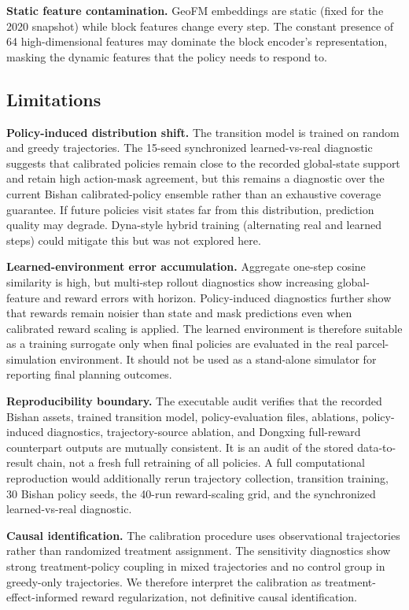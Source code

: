 \documentclass[11pt]{article}
\begin{document}
\textbf{Static feature contamination.} GeoFM embeddings are static (fixed for the 2020 snapshot) while block features change every step. The constant presence of 64 high-dimensional features may dominate the block encoder's representation, masking the dynamic features that the policy needs to respond to.

\subsection{Limitations}

\textbf{Policy-induced distribution shift.} The transition model is trained on random and greedy trajectories. The 15-seed synchronized learned-vs-real diagnostic suggests that calibrated policies remain close to the recorded global-state support and retain high action-mask agreement, but this remains a diagnostic over the current Bishan calibrated-policy ensemble rather than an exhaustive coverage guarantee. If future policies visit states far from this distribution, prediction quality may degrade. Dyna-style hybrid training (alternating real and learned steps) could mitigate this but was not explored here.

\textbf{Learned-environment error accumulation.} Aggregate one-step cosine similarity is high, but multi-step rollout diagnostics show increasing global-feature and reward errors with horizon. Policy-induced diagnostics further show that rewards remain noisier than state and mask predictions even when calibrated reward scaling is applied. The learned environment is therefore suitable as a training surrogate only when final policies are evaluated in the real parcel-simulation environment. It should not be used as a stand-alone simulator for reporting final planning outcomes.

\textbf{Reproducibility boundary.} The executable audit verifies that the recorded Bishan assets, trained transition model, policy-evaluation files, ablations, policy-induced diagnostics, trajectory-source ablation, and Dongxing full-reward counterpart outputs are mutually consistent. It is an audit of the stored data-to-result chain, not a fresh full retraining of all policies. A full computational reproduction would additionally rerun trajectory collection, transition training, 30 Bishan policy seeds, the 40-run reward-scaling grid, and the synchronized learned-vs-real diagnostic.

\textbf{Causal identification.} The calibration procedure uses observational trajectories rather than randomized treatment assignment. The sensitivity diagnostics show strong treatment-policy coupling in mixed trajectories and no control group in greedy-only trajectories. We therefore interpret the calibration as treatment-effect-informed reward regularization, not definitive causal identification.
\end{document}
